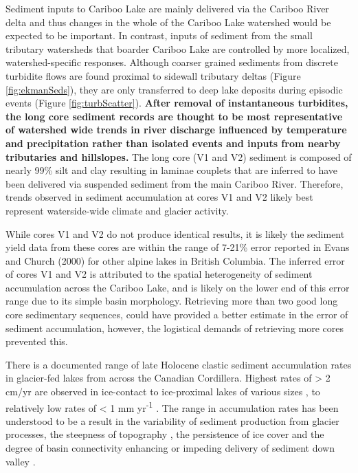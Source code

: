 \documentclass[Royal,times,doublespace,sageh]{sagej}
\begin{document}
Sediment inputs to Cariboo Lake are mainly delivered via the Cariboo
River delta and thus changes in the whole of the Cariboo Lake watershed
would be expected to be important. In contrast, inputs of sediment from
the small tributary watersheds that boarder Cariboo Lake are controlled
by more localized, watershed-specific responses. Although coarser
grained sediments from discrete turbidite flows are found proximal to
sidewall tributary deltas (Figure \ref{fig:ekmanSeds}), they are only
transferred to deep lake deposits during episodic events (Figure
\ref{fig:turbScatter}). \textbf{After removal of instantaneous
turbidites, the long core sediment records are thought to be most
representative of watershed wide trends in river discharge influenced by
temperature and precipitation rather than isolated events and inputs
from nearby tributaries and hillslopes.} The long core (V1 and V2)
sediment is composed of nearly 99\% silt and clay resulting in laminae
couplets that are inferred to have been delivered via suspended sediment
from the main Cariboo River. Therefore, trends observed in sediment
accumulation at cores V1 and V2 likely best represent waterside-wide
climate and glacier activity.

While cores V1 and V2 do not produce identical results, it is likely the
sediment yield data from these cores are within the range of 7-21\%
error reported in Evans and Church (2000) for other alpine lakes in
British Columbia. The inferred error of cores V1 and V2 is attributed to
the spatial heterogeneity of sediment accumulation across the Cariboo
Lake, and is likely on the lower end of this error range due to its
simple basin morphology. Retrieving more than two good long core
sedimentary sequences, could have provided a better estimate in the
error of sediment accumulation, however, the logistical demands of
retrieving more cores prevented this.

There is a documented range of late Holocene clastic sediment
accumulation rates in glacier-fed lakes from across the Canadian
Cordillera. Highest rates of \textgreater{} 2 cm/yr are observed in
ice-contact to ice-proximal lakes of various sizes
\citep{Desloges1994d, Crookshanks2008}, to relatively low rates of
\textless{} 1 mm yr\textsuperscript{-1} \citep{Gilbert2012}. The range
in accumulation rates has been understood to be a result in the
variability of sediment production from glacier processes, the steepness
of topography \citep{Ballantyne2002}, the persistence of ice cover and
the degree of basin connectivity enhancing or impeding delivery of
sediment down valley \citep{Wohl2019}.
\end{document}
